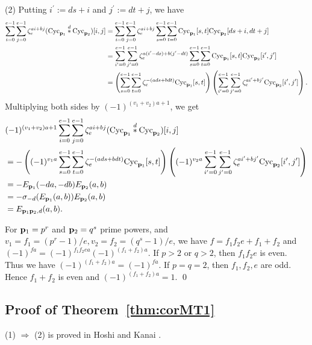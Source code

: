 \documentclass[a4paper, 11pt]{amsart}
\theoremstyle{plain}
\theoremstyle{definition}
\numberwithin{equation}{section}
\begin{document}
(2) Putting $i^{\prime}:=ds+i$ and $j^{\prime}:=dt+j$, we have
\begin{align*}
\sum_{i=0}^{e-1}\sum_{j=0}^{e-1}\zeta_e^{ai+bj}({\rm Cyc}_{{\bf p}_1}\overset{d}{\ast}{\rm Cyc}_{{\bf p}_2})[i,j]
&=\sum_{i=0}^{e-1}\sum_{j=0}^{e-1}\zeta_e^{ai+bj}
\sum^{e-1}_{s=0}\sum^{e-1}_{t=0}{\rm Cyc}_{{\bf p}_1}[s,t]{\rm Cyc}_{{\bf p}_2}[ds+i,dt+j]\\
&=\sum_{i^\prime=0}^{e-1}\sum_{j^\prime=0}^{e-1}\zeta_e^{a(i^\prime-ds)+b(j^\prime-dt)}
\sum^{e-1}_{s=0}\sum^{e-1}_{t=0}{\rm Cyc}_{{\bf p}_1}[s,t]{\rm Cyc}_{{\bf p}_2}[i^\prime,j^\prime]\\
&=\left(\sum^{e-1}_{s=0}\sum^{e-1}_{t=0}\zeta_e^{-(ads+bdt)}{\rm Cyc}_{{\bf p}_1}[s,t]\right)
\left(\sum_{i^\prime=0}^{e-1}\sum_{j^\prime=0}^{e-1}\zeta_e^{ai^\prime+bj^\prime}{\rm Cyc}_{{\bf p}_2}[i^\prime,j^\prime]\right).
\end{align*}
Multiplying both sides by $(-1)^{(v_1+v_2)a+1}$, we get
\begin{align*}
&(-1)^{(v_1+v_2)a+1}\sum_{i=0}^{e-1}\sum_{j=0}^{e-1}\zeta_e^{ai+bj}({\rm Cyc}_{{\bf p}_1}\overset{d}{\ast}{\rm Cyc}_{{\bf p}_2})[i,j]\\
&=-\left((-1)^{v_1a}\sum^{e-1}_{s=0}\sum^{e-1}_{t=0}\zeta_e^{-(ads+bdt)}{\rm Cyc}_{{\bf p}_1}[s,t]\right)
\left((-1)^{v_2a}\sum_{i^\prime=0}^{e-1}\sum_{j^\prime=0}^{e-1}\zeta_e^{ai^\prime+bj^\prime}{\rm Cyc}_{{\bf p}_2}[i^\prime,j^\prime]\right)\\
&=-E_{{\bf p}_1}(-da,-db)E_{{\bf p}_2}(a,b)\\
&=-\sigma_{-d}(E_{{\bf p}_1}(a,b))E_{{\bf p}_2}(a,b)\\
&=E_{{{\bf p}_1{\bf p}_2},d}(a,b). 
\end{align*}

For ${\bf p}_1=p^r$ and ${\bf p}_2=q^s$ prime powers, and $v_1=f_1=(p^r-1)/e, v_2=f_2=(q^s-1)/e$,
we have $f=f_1f_2e+f_1+f_2$ and $(-1)^{fa}=(-1)^{f_1f_2ea}(-1)^{(f_1+f_2)a}$. 
If $p>2$ or $q>2$, then $f_1f_2e$ is even. 
Thus we have $(-1)^{(f_1+f_2)a}=(-1)^{fa}$. 
If $p=q=2$, then $f_1, f_2, e$ are odd. 
Hence $f_1+f_2$ is even and $(-1)^{(f_1+f_2)a}=1$.
\qed\\

\subsection{Proof of Theorem~\ref{thm:corMT1}}

(1) $\Rightarrow$ (2) is proved in 
Hoshi and Kanai \cite[Theorem~1.4]{HK22}.\\
\end{document}
